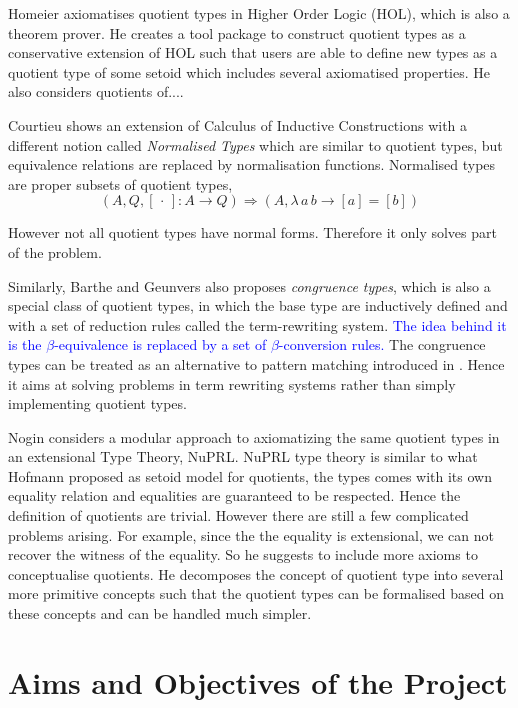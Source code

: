 \documentclass[envcountsame]{llncs}
\newcommand{\ed}[1]{\textcolor{blue}{#1}}
\newcommand{\dotph}{\,\cdot\,}
\providecommand{\class}[1]{[#1]}
\begin{document}
Homeier \cite{hom} axiomatises quotient types in Higher Order Logic (HOL), which is also a theorem prover.
He creates a tool package to construct quotient types as a conservative extension of HOL such that users are able to define new types as a quotient type of some setoid which includes several axiomatised properties. He also considers quotients of....



Courtieu \cite{cou:01} shows an extension of Calculus of Inductive Constructions
with a different notion called \emph{Normalised Types} which are similar to quotient types, but equivalence relations are replaced by normalisation functions. Normalised types are proper subsets of quotient types,
\[ (A, Q, \class\dotph \colon A \to Q) \Rightarrow(A, \lambda \,a \,b\to \class a = \class b)\]

However not all quotient types have normal forms. Therefore it only solves part of the problem.

Similarly, Barthe and Geunvers \cite{bar:96} also proposes \emph{congruence types}, which is also a special class of quotient types, in which the base type are inductively defined and with a set of reduction rules called the term-rewriting system. \ed{The idea behind it is the $\beta$-equivalence is replaced by a set of $\beta$-conversion rules.} The congruence types can be treated as an alternative to pattern matching introduced in \cite{coq:92}.
Hence it aims at solving problems in term rewriting systems rather than simply implementing quotient types.

Nogin \cite{nog:02} considers a modular approach to axiomatizing the same quotient types in an extensional Type Theory, NuPRL. NuPRL type theory is similar to what Hofmann proposed as setoid model for quotients, the types comes with its own equality relation and equalities are guaranteed to be respected. Hence the definition of quotients are trivial.
However there are still a few complicated problems arising. For example, since the the equality is extensional, we can not recover the witness of the equality. So he suggests to include more axioms to conceptualise quotients. He decomposes the concept of quotient type into several more primitive concepts such that the quotient types can be formalised based on these concepts and can be handled much simpler. 

\section{Aims and Objectives of the Project}
\end{document}

